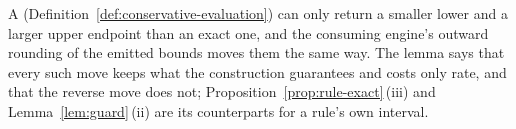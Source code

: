 
A  (Definition~\ref{def:conservative-evaluation})
can only return a smaller lower and a larger upper endpoint than an exact one,
and the consuming engine's outward rounding of the emitted bounds moves them
the same way. The lemma says that every such move keeps what the construction
guarantees and costs only rate, and that the reverse move does not;
Proposition~\ref{prop:rule-exact}\,(iii) and Lemma~\ref{lem:guard}\,(ii) are
its counterparts for a rule's own interval.

